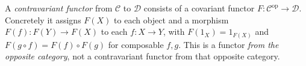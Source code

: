 
A \emph{contravariant functor} from $\mathcal C$ to $\mathcal D$ consists of a covariant functor $F:\mathcal C^{\mathrm{op}}\to\mathcal D$. Concretely it assigns $F(X)$ to each object and a morphism $F(f):F(Y)\to F(X)$ to each $f:X\to Y$, with $F(1_X)=1_{F(X)}$ and $F(g\circ f)=F(f)\circ F(g)$ for composable $f,g$. This is a functor \emph{from the opposite category}, not a contravariant functor from that opposite category.
